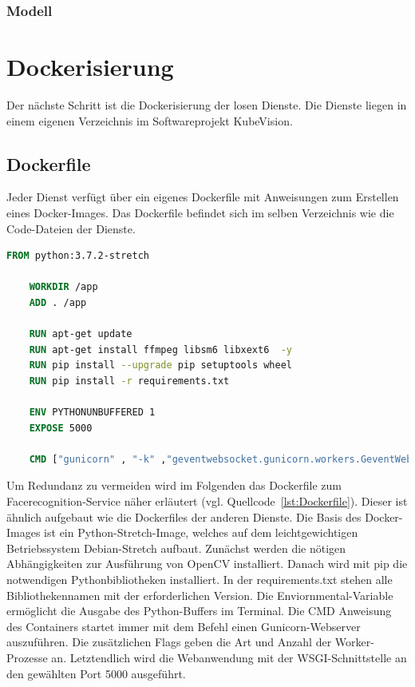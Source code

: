 \subsubsection{Modell}

\section{Dockerisierung}

Der nächste Schritt ist die Dockerisierung der losen Dienste.
Die Dienste liegen in einem eigenen Verzeichnis im Softwareprojekt KubeVision.

\subsection{Dockerfile}

Jeder Dienst verfügt über ein eigenes Dockerfile mit Anweisungen zum Erstellen eines Docker-Images.
Das Dockerfile befindet sich im selben Verzeichnis wie die Code-Dateien der Dienste.

\begin{lstlisting}[caption={Dockerfile},captionpos=b ,label={lst:Dockerfile},language=Dockerfile]
    FROM python:3.7.2-stretch
    
    WORKDIR /app
    ADD . /app
    
    RUN apt-get update
    RUN apt-get install ffmpeg libsm6 libxext6  -y
    RUN pip install --upgrade pip setuptools wheel
    RUN pip install -r requirements.txt
    
    ENV PYTHONUNBUFFERED 1
    EXPOSE 5000
    
    CMD ["gunicorn" , "-k" ,"geventwebsocket.gunicorn.workers.GeventWebSocketWorker", "-w", "3" , "--bind" , ":5000" , "run:app"]
\end{lstlisting}

Um Redundanz zu vermeiden wird im Folgenden das Dockerfile zum Facerecognition-Service näher erläutert (vgl. Quellcode~\ref{lst:Dockerfile}).
Dieser ist ähnlich aufgebaut wie die Dockerfiles der anderen Dienste.
Die Basis des Docker-Images ist ein Python-Stretch-Image, welches auf dem leichtgewichtigen Betriebssystem Debian-Stretch aufbaut.
Zunächst werden die nötigen Abhängigkeiten zur Ausführung von OpenCV installiert.
Danach wird mit pip die notwendigen Pythonbibliotheken installiert.
In der requirements.txt stehen alle Bibliothekennamen mit der erforderlichen Version.
Die Enviornmental-Variable ermöglicht die Ausgabe des Python-Buffers im Terminal.
Die CMD Anweisung des Containers startet immer mit dem Befehl einen Gunicorn-Webserver auszuführen.
Die zusätzlichen Flags geben die Art und Anzahl der Worker-Prozesse an.
Letztendlich wird die Webanwendung mit der WSGI-Schnittstelle an den gewählten Port 5000 ausgeführt.

